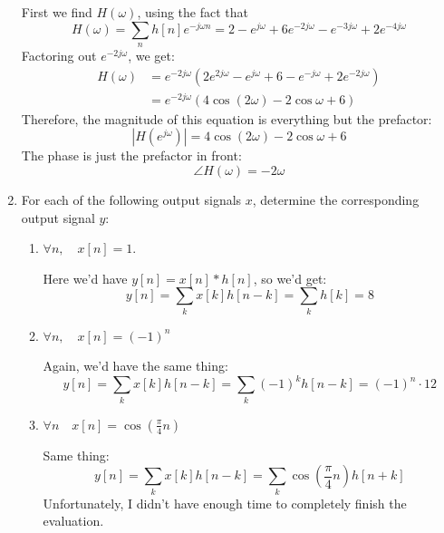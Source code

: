 \documentclass[10pt]{article}
\begin{document}
\begin{enumerate}[label=\alph*)]
			\begin{solution}
				First we find \( H(\omega) \), using the fact that 
				\[
					H(\omega) = \sum_n h[n] e^{-j \omega n } = 2 - e^{j \omega} + 6e^{-2j \omega}
					- e^{- 3 j \omega} + 2e^{-4 j \omega}
				\] 
				Factoring out \( e^{- 2 j \omega} \), we get:
				\begin{align*}
					H(\omega) &=  e^{-2 j \omega}(2e^{2 j \omega} - e^{j \omega} + 6 - e^{- j \omega} + 
					2e^{-2 j \omega} )\\
					&= e^{-2 j \omega}(4 \cos(2 \omega) - 2 \cos \omega + 6) 
				\end{align*}
				Therefore, the magnitude of this equation is everything but the prefactor:
				\[
				|H(e^{j \omega})| = 4\cos(2 \omega) - 2 \cos \omega + 6
				\] 
				The phase is just the prefactor in front:
				\[
					\angle H(\omega) = -2 \omega
				\] 
			\end{solution}
		\item For each of the following output signals \( x \), determine the corresponding output signal \( y \):
			\begin{enumerate}[label=\alph*)]
				\item \( \forall n, \quad x[n] = 1 \).

					\begin{solution}
						Here we'd have \( y[n] = x[n] * h[n] \), so we'd get:
						\[
							y[n] = \sum_k x[k] h[n - k] = \sum_k h[k] = 8
						\] 
					\end{solution}
				\item \( \forall n, \quad x[n] = (-1)^{n} \) 

					\begin{solution}
						Again, we'd have the same thing:
						\[
							y[n] = \sum_k x[k] h[n - k] = \sum_k (-1)^{k}h[n - k] = (-1)^{n} \cdot 12
						\] 
					\end{solution}
				\item \( \forall n \quad x[n] = \cos\left( \frac{\pi}{4} n\right)  \)

					\begin{solution}
						Same thing:
						\[
							y[n] = \sum_k x[k] h[n - k] = \sum_k \cos(\frac{\pi}{4}n)h[n + k]
						\] 
						Unfortunately, I didn't have enough time to completely finish the evaluation. 
					\end{solution}
			\end{enumerate}
	\end{enumerate}
\end{document}
